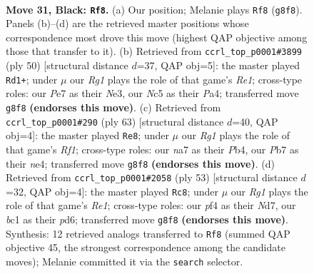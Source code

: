 \documentclass[11pt]{article}
\begin{document}
\clearpage

\begin{figure}[p]\centering
\begin{subfigure}{0.46\textwidth}\centering
\resizebox{\linewidth}{!}{%
\newchessgame
\chessboard[
  setfen={3k2r1/Npp1p2p/6p1/p1n5/5P1P/2P5/P1n2PK1/2B4R b - - 8 31},
  showmover=false,
  pgfstyle=straightmove, color=movearrow, markmove={g8-f8}
]}
\caption{}
\end{subfigure}\hfill
\begin{subfigure}{0.46\textwidth}\centering
\resizebox{\linewidth}{!}{%
\newchessgame
\chessboard[
  setfen={2r5/1bpk2pp/p4p2/7P/Pp6/1P2N3/1P3PP1/4R1K1 w - - 3 26},
  showmover=false,
  pgfstyle=straightmove, color=movearrow, markmove={e1-d1}
]}
\caption{}
\end{subfigure}
\\[4pt]
\begin{subfigure}{0.46\textwidth}\centering
\resizebox{\linewidth}{!}{%
\newchessgame
\chessboard[
  setfen={5r1k/2p2ppp/1n6/1p6/1p1PN3/1P5P/5PP1/2R3K1 b - - 2 32},
  showmover=false,
  pgfstyle=straightmove, color=movearrow, markmove={f8-e8}
]}
\caption{}
\end{subfigure}\hfill
\begin{subfigure}{0.46\textwidth}\centering
\resizebox{\linewidth}{!}{%
\newchessgame
\chessboard[
  setfen={4r1k1/3n1p2/p2Ppp1p/8/PpP5/4B2P/5PP1/3R2K1 b - - 0 27},
  showmover=false,
  pgfstyle=straightmove, color=movearrow, markmove={e8-c8}
]}
\caption{}
\end{subfigure}
\caption{\textbf{Move 31, Black: \texttt{Rf8}.} (a) Our position; Melanie plays \texttt{Rf8} (\texttt{g8f8}). Panels (b)--(d) are the retrieved master positions whose correspondence most drove this move (highest QAP objective among those that transfer to it). (b) Retrieved from \texttt{ccrl\_top\_p0001\#3899} (ply 50) [structural distance $d$=37, QAP obj=5]: the master played \texttt{Rd1+}; under $\mu$ our \emph{Rg1} plays the role of that game's \emph{Re1}; cross-type roles: our \emph{P}e7 as their \emph{N}e3, our \emph{N}c5 as their \emph{P}a4; transferred move \texttt{g8f8} \textbf{(endorses this move)}. (c) Retrieved from \texttt{ccrl\_top\_p0001\#290} (ply 63) [structural distance $d$=40, QAP obj=4]: the master played \texttt{Re8}; under $\mu$ our \emph{Rg1} plays the role of that game's \emph{Rf1}; cross-type roles: our \emph{n}a7 as their \emph{P}b4, our \emph{P}b7 as their \emph{n}e4; transferred move \texttt{g8f8} \textbf{(endorses this move)}. (d) Retrieved from \texttt{ccrl\_top\_p0001\#2058} (ply 53) [structural distance $d$=32, QAP obj=4]: the master played \texttt{Rc8}; under $\mu$ our \emph{Rg1} plays the role of that game's \emph{Re1}; cross-type roles: our \emph{p}f4 as their \emph{N}d7, our \emph{b}c1 as their \emph{p}d6; transferred move \texttt{g8f8} \textbf{(endorses this move)}. Synthesis: 12 retrieved analogs transferred to \texttt{Rf8} (summed QAP objective 45, the strongest correspondence among the candidate moves); Melanie committed it via the \texttt{search} selector.}
\label{fig:thought-m61}
\end{figure}
\end{document}
